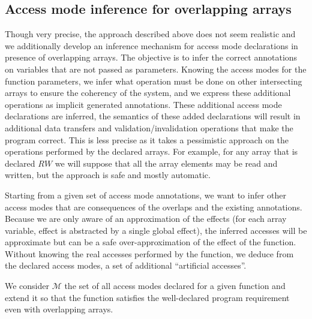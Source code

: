 \documentclass[preprint,12pt]{elsarticle}
\newcommand{\AM}{\mathcal{M}}
\begin{document}
\subsection{Access mode inference for overlapping arrays}\label{sec:infer-overlap}

Though very precise, the approach described above does not seem realistic and we additionally develop an inference mechanism for access mode declarations in presence of overlapping arrays.
The objective  is to infer the correct annotations on  variables that are not passed as parameters. Knowing the access modes for the function parameters, we infer what operation must be done on other intersecting arrays to ensure the coherency of the system, and we express these additional operations as implicit generated annotations. These additional access mode declarations are inferred, the semantics of these added declarations will result in additional data transfers and validation/invalidation operations that make the program correct. This is less precise as it takes a pessimistic approach on the operations performed by the declared arrays. For example, for any array that is declared $RW$ we will suppose that all the array elements may be read and written, but the approach is safe and mostly automatic.

Starting from a given set of access mode annotations, we want to infer other access modes that are consequences of the overlaps and the existing annotations.
Because we are only aware of an approximation of the effects (for each array variable, effect is abstracted by a single global effect), the inferred accesses will be approximate but can be a safe over-approximation of the effect of the function.
 Without knowing the real accesses performed by the function, we deduce from the declared access modes, a set of additional ``artificial accesses''.

We consider $\AM$ the set of all access modes declared for a given function and extend it so that the function satisfies the well-declared program requirement even with overlapping arrays.
\end{document}
